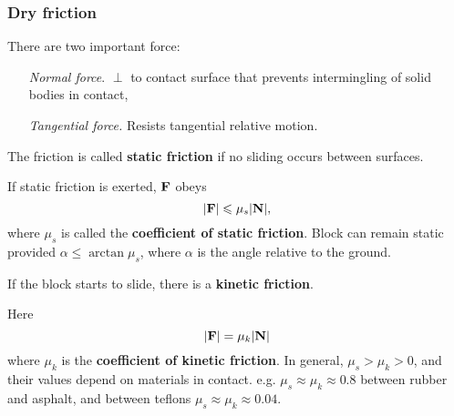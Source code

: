 \subsubsection{Dry friction}
There are two important force:
\begin{enumerate}[align=left]
    \item[\textit{Normal force}.] $ \perp $ to contact surface that prevents intermingling of solid bodies in contact,
    \item[\textit{Tangential force.}] Resists tangential relative motion. 
\end{enumerate}
\begin{center}
\end{center}

\begin{definition}
    The friction is called \textbf{static friction} if no sliding occurs between surfaces.
\end{definition}

If static friction is exerted, ${\bf F}$ obeys 
\[
    |{\bf F}|\leqslant \mu_s|{\bf N}|,
\]
where $\mu_s$ is called the \textbf{coefficient of static friction}. Block can remain static provided $ \alpha\le \arctan \mu_s $, where $ \alpha $ is the angle relative to the ground.

\begin{definition}
    If the block starts to slide, there is a \textbf{kinetic friction}.
\end{definition}
Here
\[
    |{\bf F}| = \mu_k|{\bf N}|
\]
where $ \mu_k $ is the \textbf{coefficient of kinetic friction}. In general, $ \mu_s>\mu_k>0 $, and their values depend on materials in contact. e.g. $ \mu_s\approx \mu_k\approx 0.8 $ between rubber and asphalt, and between teflons $ \mu_s\approx \mu_k\approx 0.04 $.


